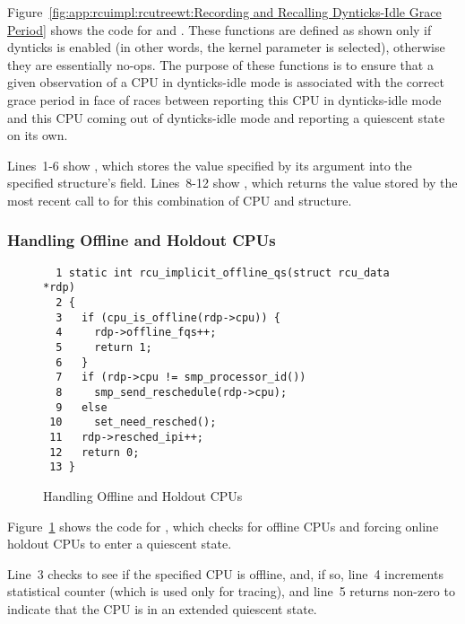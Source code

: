 Figure~\ref{fig:app:rcuimpl:rcutreewt:Recording and Recalling Dynticks-Idle Grace Period}
shows the code for  and
.
These functions are defined as shown only if dynticks
is enabled (in other words, the  kernel parameter
is selected), otherwise they are essentially no-ops.
The purpose of these functions is to ensure that a given observation
of a CPU in dynticks-idle mode is associated with the correct
grace period in face of races between reporting this CPU in
dynticks-idle mode and this CPU coming out of dynticks-idle mode
and reporting a quiescent state on its own.

Lines~1-6 show , which stores the
value specified by its  argument into the specified
 structure's  field.
Lines~8-12 show , which returns
the value stored by the most recent call to
 for this combination of CPU and
 structure.

\subsubsection{Handling Offline and Holdout CPUs}
\label{app:rcuimpl:rcutreewt:Handling Offline and Holdout CPUs}

\begin{figure}[tbp]
{ \scriptsize
\begin{verbatim}
  1 static int rcu_implicit_offline_qs(struct rcu_data *rdp)
  2 {
  3   if (cpu_is_offline(rdp->cpu)) {
  4     rdp->offline_fqs++;
  5     return 1;
  6   }
  7   if (rdp->cpu != smp_processor_id())
  8     smp_send_reschedule(rdp->cpu);
  9   else
 10     set_need_resched();
 11   rdp->resched_ipi++;
 12   return 0;
 13 }
\end{verbatim}
}
\caption{Handling Offline and Holdout CPUs}
\label{fig:app:rcuimpl:rcutreewt:Handling Offline and Holdout CPUs}
\end{figure}

Figure~\ref{fig:app:rcuimpl:rcutreewt:Handling Offline and Holdout CPUs}
shows the code for , which checks for
offline CPUs and forcing online holdout CPUs to enter a quiescent state.

Line~3 checks to see if the specified CPU is offline, and, if so,
line~4 increments statistical counter  (which is
used only for tracing), and line~5 returns non-zero to indicate
that the CPU is in an extended quiescent state.

